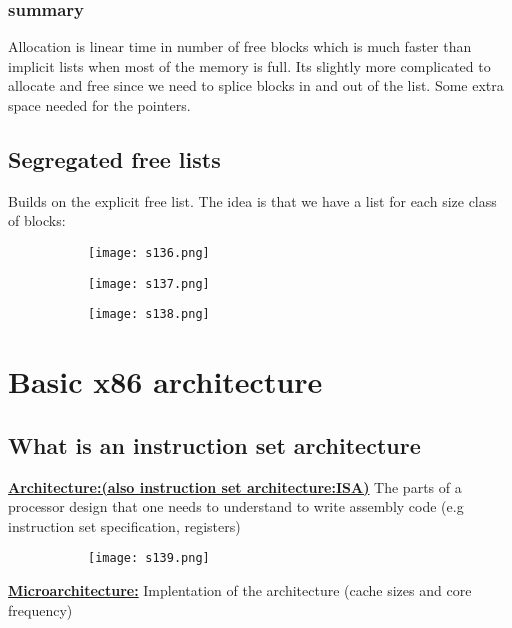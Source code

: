 \documentclass[8pt]{extreport}
\begin{document}
\subsection{summary}
Allocation is linear time in number of free blocks which is much faster than implicit lists when most of the memory is full. Its slightly more complicated to allocate and free since we need to splice blocks in and out of the list. Some extra space needed for the pointers.
\section{Segregated free lists}

Builds on the explicit free list. The idea is that we have a list for each size class of blocks:
\begin{figure}[H]
\centering
\begin{subfigure}[b]{0.4\linewidth}
\texttt{[image: s136.png]}
\end{subfigure}
\begin{subfigure}[b]{0.4\linewidth}
\texttt{[image: s137.png]}
\end{subfigure}
\begin{subfigure}[b]{0.4\linewidth}
\texttt{[image: s138.png]}
\end{subfigure}
\end{figure}

\chapter{Basic x86 architecture}

\section{What is an instruction set architecture}

\underline{\textbf{Architecture:(also instruction set architecture:ISA)}} The parts of a processor design that one needs to understand to write assembly code (e.g instruction set specification, registers)
\begin{figure}[H]
\centering
\begin{subfigure}[b]{0.4\linewidth}
\texttt{[image: s139.png]}
\end{subfigure}
\end{figure}
\underline{\textbf{Microarchitecture:}} Implentation of the architecture (cache sizes and core frequency)
\end{document}
